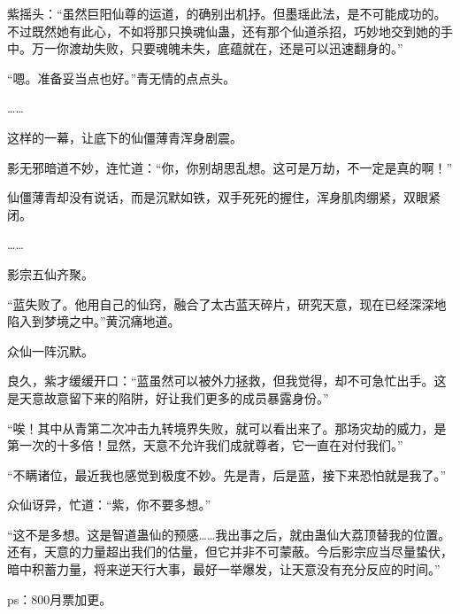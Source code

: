 \begin{this_body}
紫摇头：“虽然巨阳仙尊的运道，的确别出机抒。但墨瑶此法，是不可能成功的。不过既然她有此心，不如将那只换魂仙蛊，还有那个仙道杀招，巧妙地交到她的手中。万一你渡劫失败，只要魂魄未失，底蕴就在，还是可以迅速翻身的。”

“嗯。准备妥当点也好。”青无情的点点头。

……

这样的一幕，让底下的仙僵薄青浑身剧震。

影无邪暗道不妙，连忙道：“你，你别胡思乱想。这可是万劫，不一定是真的啊！”

仙僵薄青却没有说话，而是沉默如铁，双手死死的握住，浑身肌肉绷紧，双眼紧闭。

……

影宗五仙齐聚。

“蓝失败了。他用自己的仙窍，融合了太古蓝天碎片，研究天意，现在已经深深地陷入到梦境之中。”黄沉痛地道。

众仙一阵沉默。

良久，紫才缓缓开口：“蓝虽然可以被外力拯救，但我觉得，却不可急忙出手。这是天意故意留下来的陷阱，好让我们更多的成员暴露身份。”

“唉！其中从青第二次冲击九转境界失败，就可以看出来了。那场灾劫的威力，是第一次的十多倍！显然，天意不允许我们成就尊者，它一直在对付我们。”

“不瞒诸位，最近我也感觉到极度不妙。先是青，后是蓝，接下来恐怕就是我了。”

众仙讶异，忙道：“紫，你不要多想。”

“这不是多想。这是智道蛊仙的预感……我出事之后，就由蛊仙大荔顶替我的位置。还有，天意的力量超出我们的估量，但它并非不可蒙蔽。今后影宗应当尽量蛰伏，暗中积蓄力量，将来逆天行大事，最好一举爆发，让天意没有充分反应的时间。”

ps：800月票加更。

\end{this_body}

